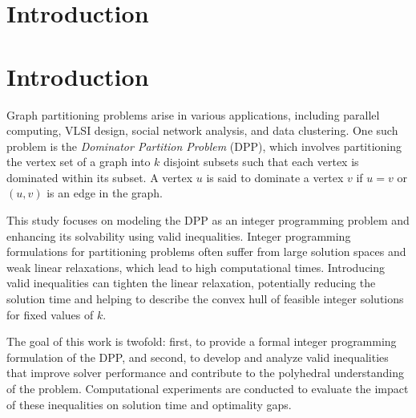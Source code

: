 \section{Introduction}
\label{sec:introduction}


\section{Introduction}

Graph partitioning problems arise in various applications, including parallel computing, VLSI design, social network analysis, and data clustering. One such problem is the \textit{Dominator Partition Problem} (DPP), which involves partitioning the vertex set of a graph into $k$ disjoint subsets such that each vertex is dominated within its subset. A vertex $u$ is said to dominate a vertex $v$ if $u = v$ or $(u,v)$ is an edge in the graph.

This study focuses on modeling the DPP as an integer programming problem and enhancing its solvability using valid inequalities. Integer programming formulations for partitioning problems often suffer from large solution spaces and weak linear relaxations, which lead to high computational times. Introducing valid inequalities can tighten the linear relaxation, potentially reducing the solution time and helping to describe the convex hull of feasible integer solutions for fixed values of $k$.

The goal of this work is twofold: first, to provide a formal integer programming formulation of the DPP, and second, to develop and analyze valid inequalities that improve solver performance and contribute to the polyhedral understanding of the problem. Computational experiments are conducted to evaluate the impact of these inequalities on solution time and optimality gaps.
